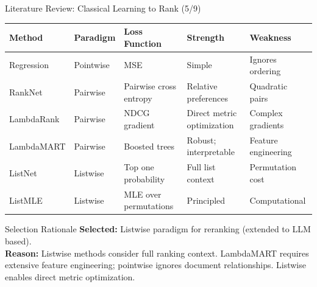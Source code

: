 \documentclass[aspectratio=169,xcolor=dvipsnames]{beamer}
\begin{document}
\begin{frame}{Literature Review: Classical Learning to Rank (5/9)}
    \scriptsize
    \begin{table}
        \centering
        \renewcommand{\arraystretch}{1.05}
        \begin{tabular}{p{}|p{}|p{}|p{}|p{}}
        \toprule
        \textbf{Method} & \textbf{Paradigm} & \textbf{Loss Function} & \textbf{Strength} & \textbf{Weakness} \\
        \midrule
        Regression & Pointwise & MSE & Simple & Ignores ordering \\
        \midrule
        RankNet \cite{burges2005learning} & Pairwise & Pairwise cross entropy & Relative preferences & Quadratic pairs \\
        \midrule
        LambdaRank \cite{burges2006learning} & Pairwise & NDCG gradient & Direct metric optimization & Complex gradients \\
        \midrule
        LambdaMART \cite{burges2010ranknet} & Pairwise & Boosted trees & Robust; interpretable & Feature engineering \\
        \midrule
        ListNet \cite{cao2007learning} & Listwise & Top one probability & Full list context & Permutation cost \\
        \midrule
        ListMLE \cite{xia2008listwise} & Listwise & MLE over permutations & Principled & Computational \\
        \bottomrule
        \end{tabular}
    \end{table}
    
    \vspace{0.3em}
    \begin{block}{Selection Rationale}
        \textbf{Selected:} Listwise paradigm for reranking (extended to LLM based). \\
        \textbf{Reason:} Listwise methods consider full ranking context. LambdaMART requires extensive feature engineering; pointwise ignores document relationships. Listwise enables direct metric optimization.
    \end{block}
\end{frame}
\end{document}
